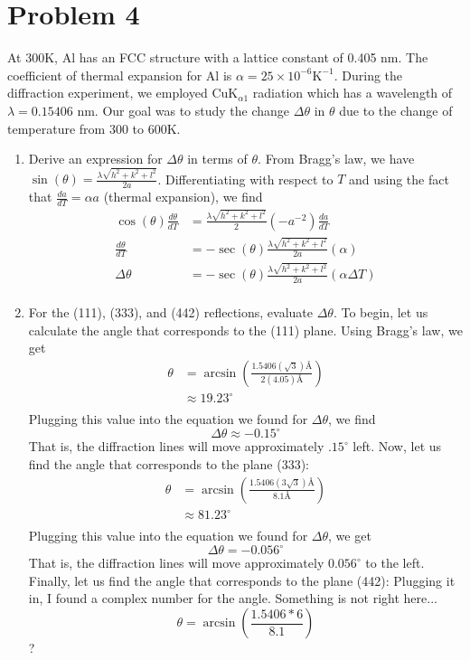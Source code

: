 \documentclass{article}
\begin{document}
\section*{Problem 4}
At 300K, Al has an FCC structure with a lattice constant of 0.405 nm. The coefficient of thermal expansion for Al is $\alpha = 25 \times 10^{-6} \text{K}^{-1}$. During the diffraction experiment, we employed $\text{CuK}_{\alpha 1}$ radiation which has a wavelength of $\lambda = 0.15406$ nm. Our goal was to study the change $\Delta \theta$ in $\theta $ due to the change of temperature from 300 to 600K.
\begin{enumerate}
    \item Derive an expression for $\Delta \theta$ in terms of $\theta$. 
    \newline
    From Bragg's law, we have $\sin{(\theta)} = \frac{\lambda\sqrt{h^2 + k^2 + l^2}}{2a}$. Differentiating with respect to $T$ and using the fact that $\frac{da}{dT} = \alpha a$ (thermal expansion), we find
    \begin{align*}
        \cos{(\theta)}\frac{d\theta}{dT} &= \frac{\lambda\sqrt{h^2 + k^2 + l^2}}{2}(-a^{-2})\frac{da}{dT} \\
        \frac{d\theta}{dT} &= -\sec{(\theta)}\frac{\lambda\sqrt{h^2+k^2+l^2}}{2a}(\alpha) \\
        \Delta \theta &= -\sec{(\theta)}\frac{\lambda \sqrt{h^2 + k^2 + l^2}}{2a}(\alpha \Delta T) \\
    \end{align*}
    
    \item For the (111), (333), and (442) reflections, evaluate $\Delta \theta$.
    \newline
    To begin, let us calculate the angle that corresponds to the (111) plane. Using Bragg's law, we get
    \begin{align*}
        \theta &= \arcsin{\left(\frac{1.5406(\sqrt{3}) \text{\AA}}{2(4.05) \text{\AA}}\right)} \\
        &\approx 19.23^{\circ} \\
    \end{align*}
    Plugging this value into the equation we found for $\Delta \theta$, we find
    \[\Delta \theta \approx -0.15^{\circ}\]
    That is, the diffraction lines will move approximately $.15^{\circ}$ left. Now, let us find the angle that corresponds to the plane (333):
    \begin{align*}
        \theta &= \arcsin{\left( \frac{1.5406(3\sqrt{3}) \text{\AA}}{8.1 \text{\AA}} \right)} \\
        &\approx 81.23^{\circ} \\
    \end{align*}
    Plugging this value into the equation we found for $\Delta \theta$, we get
    \[\Delta \theta = -0.056^{\circ}\]
    That is, the diffraction lines will move approximately $0.056^{\circ}$ to the left. Finally, let us find the angle that corresponds to the plane (442):
    \newline
    Plugging it in, I found a complex number for the angle. Something is not right here...
    \[\theta = \arcsin{\left(\frac{1.5406*6}{8.1}\right)}\]
    ?
    

\end{enumerate}
\end{document}
